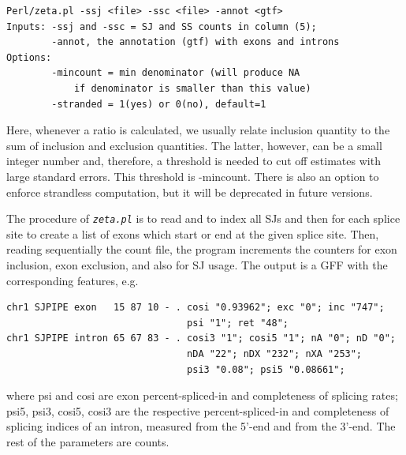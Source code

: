\documentclass{article}
\newcommand{\prog}[1]{{\tt\em #1}}
\begin{document}
\begin{verbatim}
Perl/zeta.pl -ssj <file> -ssc <file> -annot <gtf>
Inputs: -ssj and -ssc = SJ and SS counts in column (5);
        -annot, the annotation (gtf) with exons and introns
Options:
        -mincount = min denominator (will produce NA 
            if denominator is smaller than this value)
        -stranded = 1(yes) or 0(no), default=1
\end{verbatim}
Here, whenever a ratio is calculated, we usually relate inclusion quantity to the sum of inclusion and exclusion quantities. The latter, however, can be a 
small integer number and, therefore, a threshold is needed to cut off estimates with large standard errors. This threshold is -mincount. There is also an option 
to enforce strandless computation, but it will be deprecated in future versions.

The procedure of \prog{zeta.pl} is to read and to index all SJs and then for each splice site to create a list of exons which start or end at the given splice site. 
Then, reading sequentially the count file, the program increments the counters for exon inclusion, exon exclusion, and also for SJ usage. The output is a GFF with 
the corresponding features, e.g.
\begin{verbatim}
chr1 SJPIPE exon   15 87 10 - . cosi "0.93962"; exc "0"; inc "747"; 
                                psi "1"; ret "48";
chr1 SJPIPE intron 65 67 83 - . cosi3 "1"; cosi5 "1"; nA "0"; nD "0"; 
                                nDA "22"; nDX "232"; nXA "253"; 
                                psi3 "0.08"; psi5 "0.08661";
\end{verbatim}
where psi and cosi are exon percent-spliced-in and completeness of splicing rates; psi5, psi3, cosi5, cosi3 
are the respective percent-spliced-in and completeness of splicing indices of an intron, measured from the 
5'-end and from the 3'-end. The rest of the parameters are counts.

\end{document}
